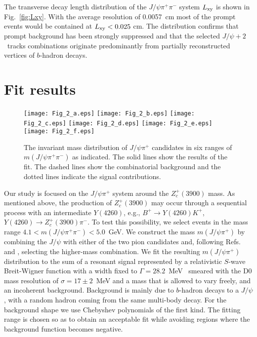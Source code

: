 \documentclass[aps,prd,twocolumn,superscriptaddress,groupedaddress,floatfix]{revtex4}
\begin{document}
The transverse decay length distribution of the $J/\psi \pi^+ \pi^-$ system  $L_{\rm xy}$ is
shown in Fig.~\ref{fig:Lxy}.
With the average resolution of 0.0057~cm most of the prompt events would be
contained at $L_{\rm xy}<0.025$ cm.  The distribution
confirms that prompt background has been strongly suppressed and that  
the  selected  $J/\psi +2$~tracks combinations
originate predominantly from partially reconstructed vertices of  $b$-hadron decays. 






\section{Fit results}

\begin{figure*}[htbp]
\texttt{[image: Fig\_2\_a.eps]}
\texttt{[image: Fig\_2\_b.eps]}
\texttt{[image: Fig\_2\_c.eps]}
\texttt{[image: Fig\_2\_d.eps]}
\texttt{[image: Fig\_2\_e.eps]}
\texttt{[image: Fig\_2\_f.eps]}
\caption{\label{fig:z2trky} 
The invariant mass distribution of  $J/\psi \pi^+$ candidates in six ranges  of $m(J/\psi \pi^+ \pi^-)$
as indicated.
The solid lines show the results of the fit. The dashed lines show the combinatorial background
and the dotted lines indicate the signal contributions.
}
\end{figure*}




Our study is focused on  the $J/\psi\pi^+$ system around  the   $Z_c^+(3900)$ mass.
As mentioned above, the production of  $Z_c^+(3900)$ may occur through a
sequential process with an intermediate  $Y(4260)$, e.g., 
 $B^+ \rightarrow Y(4260) K^+$, $Y(4260) \rightarrow Z_c^+(3900) \pi^- $.
To test this possibility, we select events in the mass range   $4.1<m(J/\psi \pi^+ \pi^-)<5.0$~GeV.
We construct the mass  $m(J/\psi\pi^+)$ by combining the $J/\psi$ with either
of the two pion candidates and, following Refs.~\cite{belle2013} and \cite{bes2013},  selecting
 the higher-mass combination.
We fit the resulting  $m(J/\psi\pi^+)$  distribution  to the  sum of a resonant signal  represented by
a  relativistic $S$-wave Breit-Wigner  function
with a  width fixed to  
 $\Gamma=28.2$~MeV~\cite{pdg} smeared with the D0  mass resolution of  $\sigma=17\pm2$~MeV and 
a mass that is allowed to vary freely, 
and an incoherent background.
Background is mainly due to $b$-hadron decays to a  $J/\psi$, with a random
  hadron coming  from the same multi-body decay.
For the background shape we use  Chebyshev polynomials of the first kind.
The fitting range  is  chosen so as to 
obtain an acceptable fit 
while  avoiding  regions where the background function becomes negative.
\end{document}
